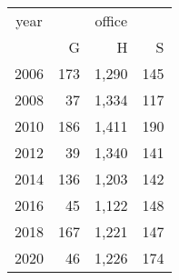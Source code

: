 \footnotesize\begin{tabular}[t]{lrrr}
\toprule
\multicolumn{1}{c}{year} & \multicolumn{3}{c}{office} \\
\cmidrule(l{3pt}r{3pt}){1-1} \cmidrule(l{3pt}r{3pt}){2-4}
  & G & H & S\\
\midrule
2006 & 173 & 1,290 & 145\\
2008 & 37 & 1,334 & 117\\
2010 & 186 & 1,411 & 190\\
2012 & 39 & 1,340 & 141\\
2014 & 136 & 1,203 & 142\\
2016 & 45 & 1,122 & 148\\
2018 & 167 & 1,221 & 147\\
2020 & 46 & 1,226 & 174\\
\bottomrule
\end{tabular}
